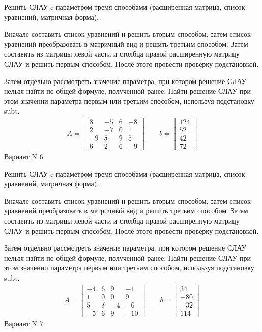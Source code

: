 \documentclass[11pt]{report}
\begin{document}
Решить СЛАУ c параметром тремя способами (расширенная матрица, список уравнений, матричная форма).

Вначале составить список уравнений и решить вторым способом,
затем список уравнений преобразовать в матричный вид и решить третьим способом.
Затем составить из матрицы левой части и столбца правой расширенную матрицу СЛАУ и решить первым способом.
После этого провести проверку подстановкой.

Затем отдельно рассмотреть значение параметра, при котором решение СЛАУ нельзя найти по общей формуле,
полученной ранее.
Найти решение СЛАУ при этом значении параметра первым или третьим способом, используя подстановку subs.
\begin{align*}
    A = \left[\begin{matrix}8 & -5 & 6 & -8\\2 & -7 & 0 & 1\\-9 & \delta & 9 & 5\\6 & 2 & 6 & -9\end{matrix}\right]
\qquad b = \left[\begin{matrix}124\\52\\42\\72\end{matrix}\right]
\end{align*}
\newpage
Вариант N 6


Решить СЛАУ c параметром тремя способами (расширенная матрица, список уравнений, матричная форма).

Вначале составить список уравнений и решить вторым способом,
затем список уравнений преобразовать в матричный вид и решить третьим способом.
Затем составить из матрицы левой части и столбца правой расширенную матрицу СЛАУ и решить первым способом.
После этого провести проверку подстановкой.

Затем отдельно рассмотреть значение параметра, при котором решение СЛАУ нельзя найти по общей формуле,
полученной ранее.
Найти решение СЛАУ при этом значении параметра первым или третьим способом, используя подстановку subs.
\begin{align*}
    A = \left[\begin{matrix}-4 & 6 & 9 & -1\\1 & 0 & 0 & 9\\5 & \delta & -4 & -6\\-5 & 6 & 9 & -10\end{matrix}\right]
\qquad b = \left[\begin{matrix}34\\-80\\-32\\114\end{matrix}\right]
\end{align*}
\newpage
Вариант N 7
\end{document}
